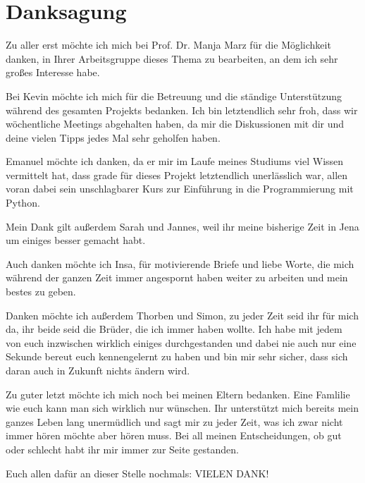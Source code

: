 \chapter*{Danksagung}


Zu aller erst möchte ich mich bei Prof. Dr. Manja Marz für die Möglichkeit danken, in Ihrer Arbeitsgruppe dieses Thema zu bearbeiten, an dem ich sehr großes Interesse habe.

\vspace{1em}

Bei Kevin möchte ich mich für die Betreuung und die ständige Unterstützung während des gesamten Projekts bedanken. Ich bin letztendlich sehr froh, dass wir wöchentliche Meetings abgehalten haben, da mir die Diskussionen mit dir und deine vielen Tipps jedes Mal sehr geholfen haben. 

\vspace{1em}

Emanuel möchte ich danken, da er mir im Laufe meines Studiums viel Wissen vermittelt hat, dass grade für dieses Projekt letztendlich unerlässlich war, allen voran dabei sein unschlagbarer Kurs zur Einführung in die Programmierung mit Python.

\vspace{1em}

Mein Dank gilt außerdem Sarah und Jannes, weil ihr meine bisherige Zeit in Jena um einiges besser gemacht habt.

\vspace{1em}

Auch danken möchte ich Insa, für motivierende Briefe und liebe Worte, die mich während der ganzen Zeit immer angespornt haben weiter zu arbeiten und mein bestes zu geben.

\vspace{1em}

Danken möchte ich außerdem Thorben und Simon, zu jeder Zeit seid ihr für mich da, ihr beide seid die Brüder, die ich immer haben wollte. Ich habe mit jedem von euch inzwischen wirklich einiges durchgestanden und dabei nie auch nur eine Sekunde bereut euch kennengelernt zu haben und bin mir sehr sicher, dass sich daran auch in Zukunft nichts ändern wird.

\vspace{1em}

Zu guter letzt möchte ich mich noch bei meinen Eltern bedanken. Eine Famlilie wie euch kann man sich wirklich nur wünschen. Ihr unterstützt mich bereits mein ganzes Leben lang unermüdlich und sagt mir zu jeder Zeit, was ich zwar nicht immer hören möchte aber hören muss. Bei all meinen Entscheidungen, ob gut oder schlecht habt ihr mir immer zur Seite gestanden. 

\vspace{1em}

Euch allen dafür an dieser Stelle nochmals: VIELEN DANK!